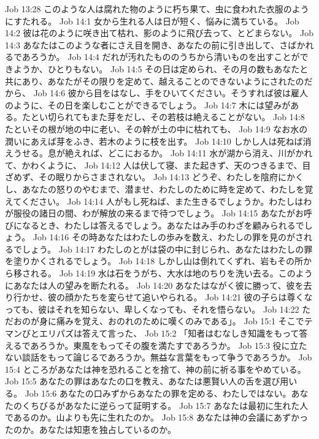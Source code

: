Job 13:28  このような人は腐れた物のように朽ち果て、虫に食われた衣服のようにすたれる。
Job 14:1  女から生れる人は日が短く、悩みに満ちている。
Job 14:2  彼は花のように咲き出て枯れ、影のように飛び去って、とどまらない。
Job 14:3  あなたはこのような者にさえ目を開き、あなたの前に引き出して、さばかれるであろうか。
Job 14:4  だれが汚れたもののうちから清いものを出すことができようか、ひとりもない。
Job 14:5  その日は定められ、その月の数もあなたと共にあり、あなたがその限りを定めて、越えることのできないようにされたのだから、
Job 14:6  彼から目をはなし、手をひいてください。そうすれば彼は雇人のように、その日を楽しむことができるでしょう。
Job 14:7  木には望みがある。たとい切られてもまた芽をだし、その若枝は絶えることがない。
Job 14:8  たといその根が地の中に老い、その幹が土の中に枯れても、
Job 14:9  なお水の潤いにあえば芽をふき、若木のように枝を出す。
Job 14:10  しかし人は死ねば消えうせる。息が絶えれば、どこにおるか。
Job 14:11  水が湖から消え、川がかれて、かわくように、
Job 14:12  人は伏して寝、また起きず、天のつきるまで、目ざめず、その眠りからさまされない。
Job 14:13  どうぞ、わたしを陰府にかくし、あなたの怒りのやむまで、潜ませ、わたしのために時を定めて、わたしを覚えてください。
Job 14:14  人がもし死ねば、また生きるでしょうか。わたしはわが服役の諸日の間、わが解放の来るまで待つでしょう。
Job 14:15  あなたがお呼びになるとき、わたしは答えるでしょう。あなたはみ手のわざを顧みられるでしょう。
Job 14:16  その時あなたはわたしの歩みを数え、わたしの罪を見のがされるでしょう。
Job 14:17  わたしのとがは袋の中に封じられ、あなたはわたしの罪を塗りかくされるでしょう。
Job 14:18  しかし山は倒れてくずれ、岩もその所から移される。
Job 14:19  水は石をうがち、大水は地のちりを洗い去る。このようにあなたは人の望みを断たれる。
Job 14:20  あなたはながく彼に勝って、彼を去り行かせ、彼の顔かたちを変らせて追いやられる。
Job 14:21  彼の子らは尊くなっても、彼はそれを知らない、卑しくなっても、それを悟らない。
Job 14:22  ただおのが身に痛みを覚え、おのれのために嘆くのみである」。
Job 15:1  そこでテマンびとエリパズは答えて言った、
Job 15:2  「知者はむなしき知識をもって答えるであろうか。東風をもってその腹を満たすであろうか。
Job 15:3  役に立たない談話をもって論じるであろうか。無益な言葉をもって争うであろうか。
Job 15:4  ところがあなたは神を恐れることを捨て、神の前に祈る事をやめている。
Job 15:5  あなたの罪はあなたの口を教え、あなたは悪賢い人の舌を選び用いる。
Job 15:6  あなたの口みずからあなたの罪を定める、わたしではない。あなたのくちびるがあなたに逆らって証明する。
Job 15:7  あなたは最初に生れた人であるのか。山よりも先に生れたのか。
Job 15:8  あなたは神の会議にあずかったのか。あなたは知恵を独占しているのか。
